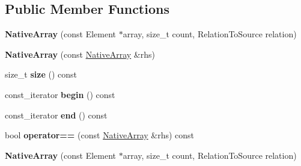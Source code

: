 \subsection*{Public Member Functions}
\begin{DoxyCompactItemize}
\item 
\hypertarget{classtesting_1_1internal_1_1_native_array_a568de999aca0fc0c2cc574fac2405872}{}{\bfseries Native\+Array} (const Element $\ast$array, size\+\_\+t count, Relation\+To\+Source relation)\label{classtesting_1_1internal_1_1_native_array_a568de999aca0fc0c2cc574fac2405872}

\item 
\hypertarget{classtesting_1_1internal_1_1_native_array_abb346ac3040f5da733f594cc2d5958bc}{}{\bfseries Native\+Array} (const \hyperlink{classtesting_1_1internal_1_1_native_array}{Native\+Array} \&rhs)\label{classtesting_1_1internal_1_1_native_array_abb346ac3040f5da733f594cc2d5958bc}

\item 
\hypertarget{classtesting_1_1internal_1_1_native_array_a45de2485baac8bf148e2943828094a40}{}size\+\_\+t {\bfseries size} () const \label{classtesting_1_1internal_1_1_native_array_a45de2485baac8bf148e2943828094a40}

\item 
\hypertarget{classtesting_1_1internal_1_1_native_array_a49c534d29034d9230372ada54ef961bb}{}const\+\_\+iterator {\bfseries begin} () const \label{classtesting_1_1internal_1_1_native_array_a49c534d29034d9230372ada54ef961bb}

\item 
\hypertarget{classtesting_1_1internal_1_1_native_array_a4957ad1ebf7c21eab07d5e0ae2bb17aa}{}const\+\_\+iterator {\bfseries end} () const \label{classtesting_1_1internal_1_1_native_array_a4957ad1ebf7c21eab07d5e0ae2bb17aa}

\item 
\hypertarget{classtesting_1_1internal_1_1_native_array_a60af8d9c429771ee131b5ddf7e06e3c9}{}bool {\bfseries operator==} (const \hyperlink{classtesting_1_1internal_1_1_native_array}{Native\+Array} \&rhs) const \label{classtesting_1_1internal_1_1_native_array_a60af8d9c429771ee131b5ddf7e06e3c9}

\item 
\hypertarget{classtesting_1_1internal_1_1_native_array_a568de999aca0fc0c2cc574fac2405872}{}{\bfseries Native\+Array} (const Element $\ast$array, size\+\_\+t count, Relation\+To\+Source relation)\label{classtesting_1_1internal_1_1_native_array_a568de999aca0fc0c2cc574fac2405872}


\end{DoxyCompactItemize}
